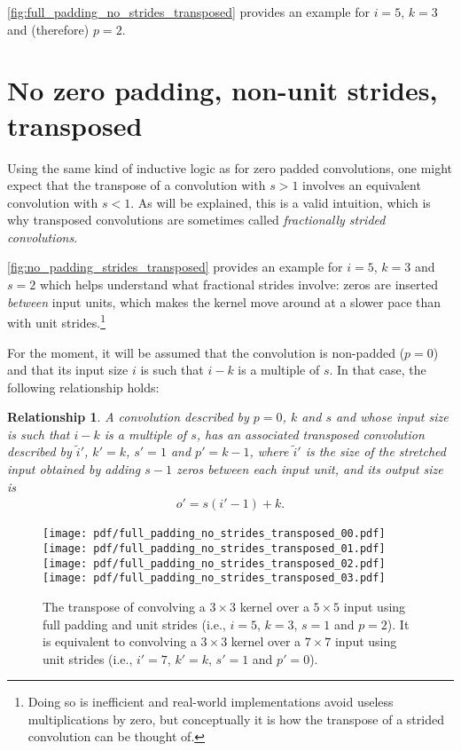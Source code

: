\documentclass[notitlepage]{report}
\newtheorem{relationship}{Relationship}
\begin{document}
\autoref{fig:full_padding_no_strides_transposed} provides an example for $i =
5$, $k = 3$ and (therefore) $p = 2$.

\section{No zero padding, non-unit strides, transposed}

Using the same kind of inductive logic as for zero padded convolutions, one
might expect that the transpose of a convolution with $s > 1$ involves an
equivalent convolution with $s < 1$. As will be explained, this is a valid
intuition, which is why transposed convolutions are sometimes called {\em
fractionally strided convolutions}.

\autoref{fig:no_padding_strides_transposed} provides an example for $i = 5$, $k
= 3$ and $s = 2$ which helps understand what fractional strides involve: zeros
are inserted {\em between\/} input units, which makes the kernel move around at
a slower pace than with unit strides.\footnote{Doing so is inefficient and
    real-world implementations avoid useless multiplications by zero, but
    conceptually it is how the transpose of a strided convolution can be
    thought of.}

For the moment, it will be assumed that the convolution is non-padded ($p = 0$)
and that its input size $i$ is such that $i - k$ is a multiple of $s$. In that
case, the following relationship holds:

\begin{relationship}\label{rel:no_padding_strides_transposed}
A convolution described by $p = 0$, $k$ and $s$ and whose input
size is such that $i - k$ is a multiple of $s$, has an associated transposed
convolution described by $\tilde{i}'$, $k' = k$, $s' = 1$ and $p' = k - 1$,
where $\tilde{i}'$ is the size of the stretched input obtained by adding
$s - 1$ zeros between each input unit, and its output size is
\begin{equation*}
\begin{split}
    o' = s (i' - 1) + k.
\end{split}
\end{equation*}
\end{relationship}

\begin{figure}[p]
    \centering
    \texttt{[image: pdf/full\_padding\_no\_strides\_transposed\_00.pdf]}
    \texttt{[image: pdf/full\_padding\_no\_strides\_transposed\_01.pdf]}
    \texttt{[image: pdf/full\_padding\_no\_strides\_transposed\_02.pdf]}
    \texttt{[image: pdf/full\_padding\_no\_strides\_transposed\_03.pdf]}
    \caption{\label{fig:full_padding_no_strides_transposed} The transpose of
        convolving a $3 \times 3$ kernel over a $5 \times 5$ input using full
        padding and unit strides (i.e., $i = 5$, $k = 3$, $s = 1$ and $p = 2$).
        It is equivalent to convolving a $3 \times 3$ kernel over a $7 \times 7$
        input using unit strides (i.e., $i' = 7$, $k' = k$, $s' = 1$ and $p' =
        0$).}
\end{figure}
\end{document}
